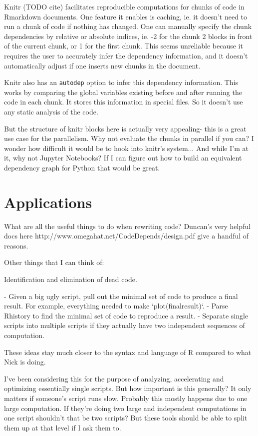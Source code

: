 \documentclass[12pt]{article}
\begin{document}
Knitr (TODO cite) facilitates reproducible computations for
chunks of code in Rmarkdown documents. One feature it enables is caching,
ie. it doesn't need to run a chunk of code if nothing has changed. One can
manually specify the chunk dependencies by relative or absolute indices,
ie. -2 for the chunk 2 blocks in front of the current chunk, or 1 for the
first chunk. This seems unreliable because it requires the user to
accurately infer the dependency information, and it doesn't automatically
adjust if one inserts new chunks in the document.

Knitr also has an \texttt{autodep} option to infer this dependency
information. This works by comparing the global variables existing before
and after running the code in each chunk. It stores this information in
special files. So it doesn't use any static analysis of the code.

But the structure of knitr blocks here is actually very appealing- this is
a great use case for the parallelism. Why not evaluate the chunks in
parallel if you can? I wonder how difficult it would be to hook into
knitr's system... And while I'm at it, why not Jupyter Notebooks? If I can
figure out how to build an equivalent dependency graph for Python that
would be great.


\section{Applications}

What are all the useful things to do when rewriting code?  Duncan's very
helpful docs here http://www.omegahat.net/CodeDepends/design.pdf give a
handful of reasons.

Other things that I can think of:

Identification and elimination of dead code.

- Given a big ugly script, pull out the minimal set of code to produce a
  final result. For example, everything needed to make `plot(finalresult)`.
- Parse Rhistory to find the minimal set of code to reproduce a result.
- Separate single scripts into multiple scripts if they actually have two
  independent sequences of computation.

These ideas stay much closer to the syntax and language of R compared to
what Nick is doing.

I've been considering this for the purpose of analyzing, accelerating and
optimizing essentially single scripts. But how important is this generally?
It only matters if someone's script runs slow. Probably this mostly happens
due to one large computation. If they're doing two large and independent
computations in one script shouldn't that be two scripts? But these tools
should be able to split them up at that level if I ask them to.
\end{document}

